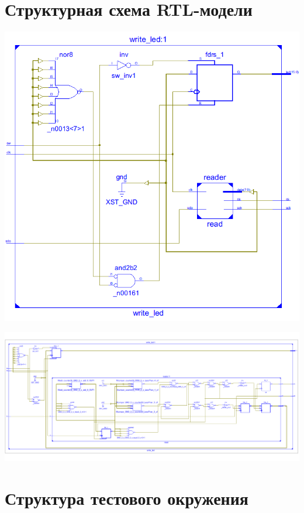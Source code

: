 

\section{Структурная схема RTL-модели}
\begin{centering}
\includegraphics[width=\textwidth]{img/scheme1.png}

\includegraphics[width=\textwidth]{img/scheme2.png}
\end{centering}

\section{Структура тестового окружения}


